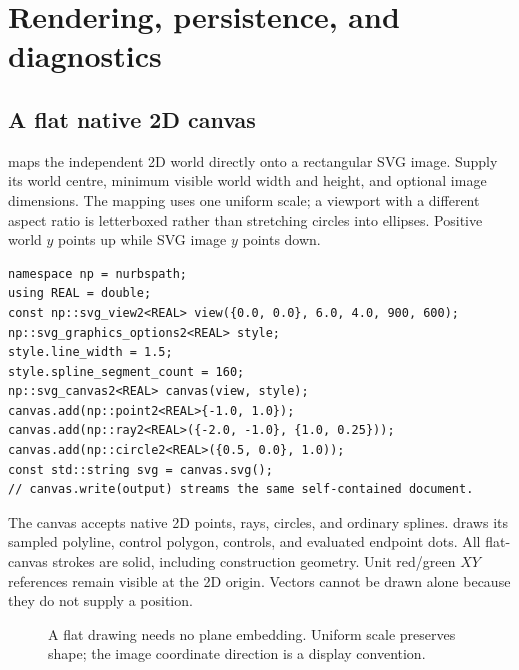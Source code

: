 \chapter{Rendering, persistence, and diagnostics}\label{chap:output}
\section{A flat native 2D canvas}
 maps the independent 2D world directly onto a rectangular
SVG image. Supply its world centre, minimum visible world width and height,
and optional image dimensions. The mapping uses one uniform scale; a viewport
with a different aspect ratio is letterboxed rather than stretching circles
into ellipses. Positive world $y$ points up while SVG image $y$ points down.

\begin{lstlisting}
namespace np = nurbspath;
using REAL = double;
const np::svg_view2<REAL> view({0.0, 0.0}, 6.0, 4.0, 900, 600);
np::svg_graphics_options2<REAL> style;
style.line_width = 1.5;
style.spline_segment_count = 160;
np::svg_canvas2<REAL> canvas(view, style);
canvas.add(np::point2<REAL>{-1.0, 1.0});
canvas.add(np::ray2<REAL>({-2.0, -1.0}, {1.0, 0.25}));
canvas.add(np::circle2<REAL>({0.5, 0.0}, 1.0));
const std::string svg = canvas.svg();
// canvas.write(output) streams the same self-contained document.
\end{lstlisting}
The canvas accepts native 2D points, rays, circles, and ordinary splines.
 draws its sampled polyline, control polygon, controls, and
evaluated endpoint dots. All flat-canvas strokes are solid, including
construction geometry. Unit red/green $XY$ references remain visible at the
2D origin. Vectors cannot be drawn alone because they do not supply a position.

\begin{figure}[htbp]\centering
{}
\caption{A flat drawing needs no plane embedding. Uniform scale preserves
shape; the image coordinate direction is a display convention.}
\label{fig:flat-canvas}
\end{figure}

